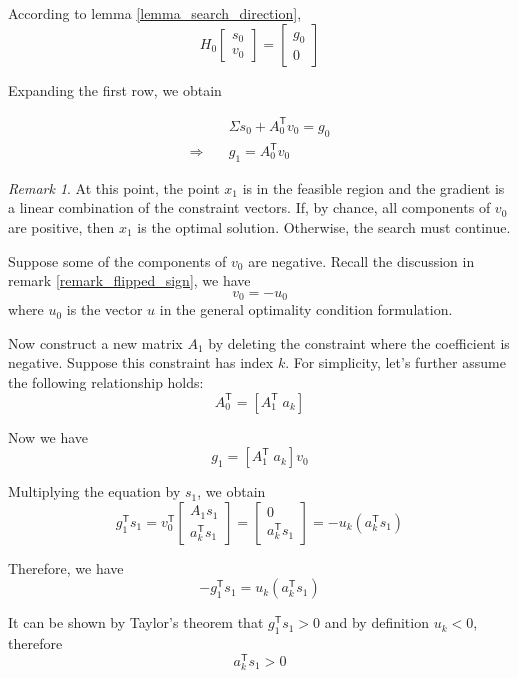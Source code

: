 \documentclass[letterpaper, oneside]{book}
\theoremstyle{definition}
\theoremstyle{remark}
\newtheorem*{remark}{Remark}
\begin{document}
According to lemma \ref{lemma_search_direction}, 
\[
H_0	
\begin{bmatrix}
	s_0\\
	v_0
\end{bmatrix}
= 
\begin{bmatrix}
	g_0 \\
	0
\end{bmatrix}
\]

Expanding the first row, we obtain

\begin{align*}
	& \Sigma s_0 + A_0^{\mathsf{T}} v_0 = g_0 \\
	\Rightarrow \quad & g_1 = A_0^{\mathsf{T}} v_0
\end{align*}


\begin{remark}
	At this point, the point $x_1$ is in the feasible region and the gradient is a linear combination of the constraint vectors. If, by chance, all components of $v_0$ are positive, then $x_1$ is the optimal solution. Otherwise, the search must continue.
\end{remark}

Suppose some of the components of $v_0$ are negative. Recall the discussion in remark \ref{remark_flipped_sign}, we have 
\[
	v_0 = -u_0
\]
where $u_0$ is the vector $u$ in the general optimality condition formulation.

Now construct a new matrix $A_1$ by deleting the constraint where the coefficient is negative. Suppose this constraint has index $k$. For simplicity, let's further assume the following relationship holds:
\[
	A_0^{\mathsf{T}} = [A_1^{\mathsf{T}} \; a_k]
\]

Now we have
\[
	g_1 = [A_1^{\mathsf{T}} \; a_k] v_0
\]

Multiplying the equation by $s_1$, we obtain
\[
	g_1^{\mathsf{T}} s_1 = v_0^{\mathsf{T}} 
	\begin{bmatrix}
		A_1 s_1\\
		a_k^{\mathsf{T}} s_1
	\end{bmatrix} = 
	\begin{bmatrix}
	0\\
	a_k^{\mathsf{T}} s_1
	\end{bmatrix}
	= -u_k(a_k^{\mathsf{T}} s_1)
\]

Therefore, we have 
\[
	-g_1^{\mathsf{T}} s_1 = u_k(a_k^{\mathsf{T}} s_1)
\]

It can be shown by Taylor's theorem that $g_1^{\mathsf{T}} s_1 > 0$ and by definition $u_k < 0$, therefore 
\[
	a_k^{\mathsf{T}}s_1 > 0
\]
\end{document}
